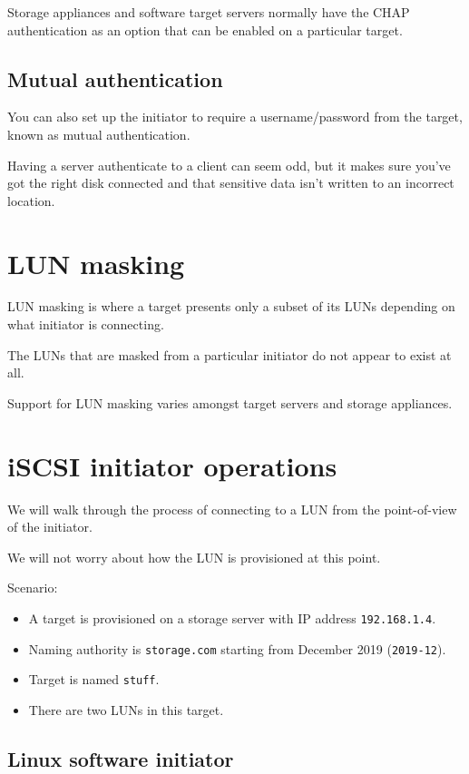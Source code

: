 \documentclass[slides]{pgnotes}
\begin{document}
Storage appliances and software target servers normally have the CHAP authentication as an option that can be enabled on a particular target.


\subsection{Mutual authentication}

You can also set up the initiator to require a username/password from the target, known as mutual authentication.

Having a server authenticate to a client can seem odd, but it makes sure you've got the right disk connected and that sensitive data isn't written to an incorrect location.


\section{LUN masking}
\label{sec:lun-masking}

LUN masking is where a target presents only a subset of its LUNs depending on what initiator is connecting.

The LUNs that are masked from a particular initiator do not appear to exist at all.

Support for LUN masking varies amongst target servers and storage appliances.


\section{iSCSI initiator operations}
\label{sec:iscsi-initiator-operations}

We will walk through the process of connecting to a LUN from the point-of-view of the initiator.

We will not worry about how the LUN is provisioned at this point.

Scenario:
\begin{itemize}
\item A target is provisioned on a storage server with IP address \texttt{192.168.1.4}.
\item Naming authority is \texttt{storage.com} starting from December 2019 (\texttt{2019-12}).
\item Target is named \texttt{stuff}.
\item There are two LUNs in this target.
\end{itemize}

\subsection{Linux software initiator}
\label{sec:linux-software-initiator}
\end{document}
